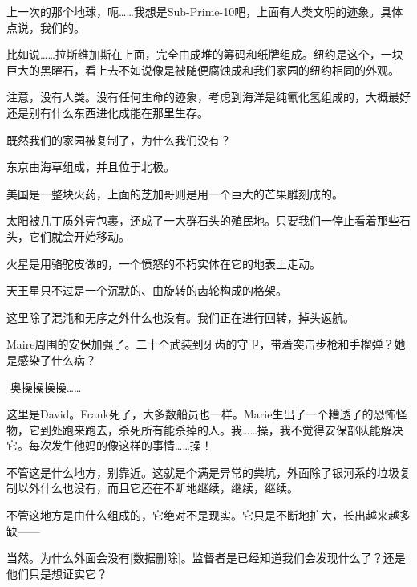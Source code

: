 \hr

\begin{scpbox}


上一次的那个地球，呃……我想是Sub-Prime-10吧，上面有人类文明的迹象。具体点说，我们的。

比如说……拉斯维加斯在上面，完全由成堆的筹码和纸牌组成。纽约是这个，一块巨大的黑曜石，看上去不如说像是被随便腐蚀成和我们家园的纽约相同的外观。

注意，没有人类。没有任何生命的迹象，考虑到海洋是纯氰化氢组成的，大概最好还是别有什么东西进化成能在那里生存。

既然我们的家园被复制了，为什么我们没有？


\end{scpbox}

\hr

\begin{scpbox}


东京由海草组成，并且位于北极。

美国是一整块火药，上面的芝加哥则是用一个巨大的芒果雕刻成的。

太阳被几丁质外壳包裹，还成了一大群石头的殖民地。只要我们一停止看着那些石头，它们就会开始移动。

火星是用骆驼皮做的，一个愤怒的不朽实体在它的地表上走动。

天王星只不过是一个沉默的、由旋转的齿轮构成的格架。

这里除了混沌和无序之外什么也没有。我们正在进行回转，掉头返航。

Maire周围的安保加强了。二十个武装到牙齿的守卫，带着突击步枪和手榴弹？她是感染了什么病？


\end{scpbox}

\hr

\begin{scpbox}


-奥操操操操……

这里是David。Frank死了，大多数船员也一样。Marie生出了一个糟透了的恐怖怪物，它到处跑来跑去，杀死所有能杀掉的人。我……操，我不觉得安保部队能解决它。每次发生他妈的像这样的事情……操！

不管这是什么地方，别靠近。这就是个满是异常的粪坑，外面除了银河系的垃圾复制以外什么也没有，而且它还在不断地继续，继续，继续。

不管这地方是由什么组成的，它绝对不是现实。它只是不断地扩大，长出越来越多缺——


当然。为什么外面会没有{[}数据删除]。监督者是已经知道我们会发现什么了？还是他们只是想证实它？


\end{scpbox}

